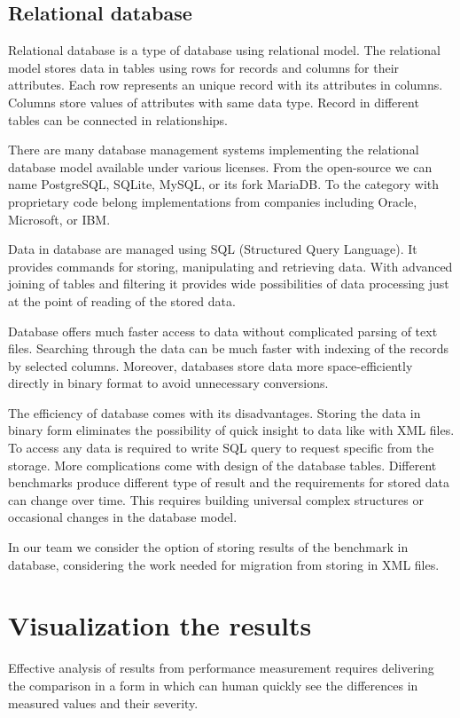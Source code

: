 \subsection{Relational database}
Relational database is a type of database using relational model. The relational
model stores data in tables using rows for records and columns for their
attributes. Each row represents an unique record with its attributes in columns.
Columns store values of attributes with same data type. Record in different
tables can be connected in relationships.

There are many database management systems implementing the relational database
model available under various licenses. From the open-source we can name
PostgreSQL, SQLite, MySQL, or its fork MariaDB. To the category with proprietary
code belong implementations from companies including Oracle, Microsoft, or IBM.

Data in database are managed using SQL (Structured Query Language). It provides
commands for storing, manipulating and retrieving data. With advanced joining of
tables and filtering it provides wide possibilities of data processing just at
the point of reading of the stored data.

Database offers much faster access to data without complicated parsing of text
files. Searching through the data can be much faster with indexing of the
records by selected columns. Moreover, databases store data more
space-efficiently directly in binary format to avoid unnecessary conversions.

The efficiency of database comes with its disadvantages. 
Storing the data in binary form eliminates the possibility of quick insight to
data like with XML files. To access any data is required to write SQL query to
request specific from the storage.
More complications come with design of the database tables. Different benchmarks
produce different type of result and the requirements for stored data can change
over time. This requires building universal complex structures or occasional
changes in the database model.

In our team we consider the option of storing results of the benchmark in
database, considering the work needed for migration from storing in XML files.

\section{Visualization the results} \label{sec:visualization}
Effective analysis of results from performance measurement requires delivering
the comparison in a form in which can human quickly see the differences in
measured values and their severity.

